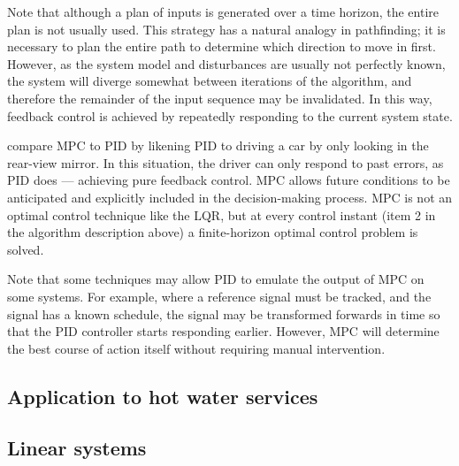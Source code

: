 Note that although a plan of inputs is generated over a time horizon, the entire plan is not usually used.
This strategy has a natural analogy in pathfinding; it is necessary to plan the entire path to determine which direction to move in first.
However, as the system model and disturbances are usually not perfectly known, the system will diverge somewhat between iterations of the algorithm, and therefore the remainder of the input sequence may be invalidated.
In this way, feedback control is achieved by repeatedly responding to the current system state.

 compare MPC to PID by likening PID to driving a car by only looking in the rear-view mirror.
In this situation, the driver can only respond to past errors, as PID does --- achieving pure feedback control.
MPC allows future conditions to be anticipated and explicitly included in the decision-making process.
MPC is not an optimal control technique like the LQR, but at every control instant (item 2 in the algorithm description above) a finite-horizon optimal control problem is solved.

Note that some techniques may allow PID to emulate the output of MPC on some systems.
For example, where a reference signal must be tracked, and the signal has a known schedule, the signal may be transformed forwards in time so that the PID controller starts responding earlier.
However, MPC will determine the best course of action itself without requiring manual intervention.

\subsection{Application to hot water services}



\subsection{Linear systems}

